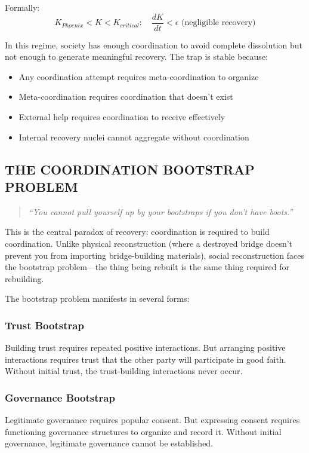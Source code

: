 \documentclass[11pt,letterpaper]{article}
\newcommand{\kindex}{K}
\begin{document}
Formally:
\begin{equation}
\kindex_{Phoenix} < \kindex < \kindex_{critical}: \quad \frac{d\kindex}{dt} < \epsilon \text{ (negligible recovery)}
\label{eq:trap}
\end{equation}

In this regime, society has enough coordination to avoid complete dissolution but not enough to generate meaningful recovery. The trap is stable because:
\begin{itemize}
\item Any coordination attempt requires meta-coordination to organize
\item Meta-coordination requires coordination that doesn't exist
\item External help requires coordination to receive effectively
\item Internal recovery nuclei cannot aggregate without coordination
\end{itemize}

\subsection{THE COORDINATION BOOTSTRAP PROBLEM}

\begin{quote}
\textit{``You cannot pull yourself up by your bootstraps if you don't have boots.''}
\end{quote}

This is the central paradox of recovery: coordination is required to build coordination. Unlike physical reconstruction (where a destroyed bridge doesn't prevent you from importing bridge-building materials), social reconstruction faces the bootstrap problem---the thing being rebuilt is the same thing required for rebuilding.

The bootstrap problem manifests in several forms:

\subsubsection{Trust Bootstrap}
Building trust requires repeated positive interactions. But arranging positive interactions requires trust that the other party will participate in good faith. Without initial trust, the trust-building interactions never occur.

\subsubsection{Governance Bootstrap}
Legitimate governance requires popular consent. But expressing consent requires functioning governance structures to organize and record it. Without initial governance, legitimate governance cannot be established.
\end{document}
